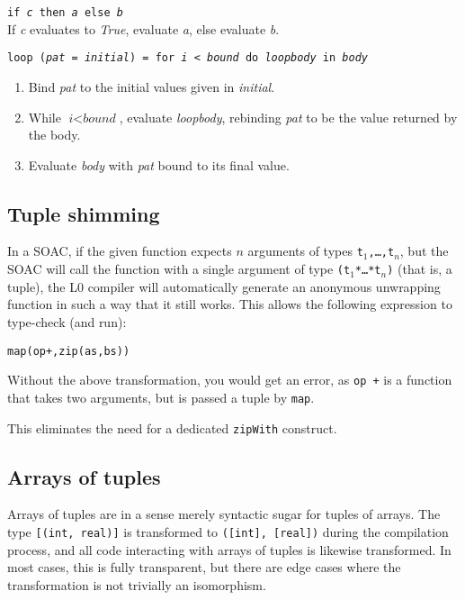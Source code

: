 \documentclass[oneside]{memoir}
\begin{document}
\begin{description}
  \item{\texttt{if \textit{c} then \textit{a} else \textit{b}}}\hfill\\
    If \textit{c} evaluates to \textit{True}, evaluate \textit{a},
    else evaluate \textit{b}.

  \item{\texttt{loop (\textit{pat} = \textit{initial}) = for \textit{i} < \textit{bound} do \textit{loopbody} in \textit{body}}}
    \begin{enumerate}
    \item Bind \textit{pat} to the initial values given in \textit{initial}.
    \item While $\textit{i} < \textit{bound}$, evaluate \textit{loopbody},
      rebinding \textit{pat} to be the value returned by the body.
    \item Evaluate \textit{body} with \textit{pat} bound to its final
      value.
    \end{enumerate}

\end{description}

\subsection{Tuple shimming}

In a SOAC, if the given function expects $n$ arguments of types
\texttt{t$_{1}$,\ldots,{}t$_{n}$}, but the SOAC will call the function
with a single argument of type \texttt{(t$_{1}$*\ldots{}*t$_{n}$)}
(that is, a tuple), the L0 compiler will automatically generate an
anonymous unwrapping function in such a way that it still works.  This
allows the following expression to type-check (and run):

\begin{alltt}
  map(op +, zip(as, bs))
\end{alltt}

Without the above transformation, you would get an error, as
\texttt{op +} is a function that takes two arguments, but is passed a
tuple by \texttt{map}.

This eliminates the need for a dedicated \texttt{zipWith} construct.

\subsection{Arrays of tuples}

Arrays of tuples are in a sense merely syntactic sugar for tuples of
arrays.  The type \texttt{[(int, real)]} is transformed to
\texttt{([int], [real])} during the compilation process, and all code
interacting with arrays of tuples is likewise transformed.  In most
cases, this is fully transparent, but there are edge cases where the
transformation is not trivially an isomorphism.
\end{document}
